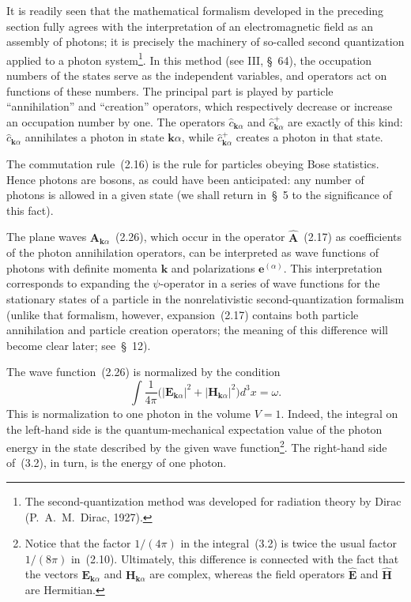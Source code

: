 It is readily seen that the mathematical formalism developed in the preceding section fully agrees with the interpretation of an electromagnetic field as an assembly of photons; it is precisely the machinery of so-called second quantization applied to a photon system\footnote{The second-quantization method was developed for radiation theory by Dirac (P.~A.~M.~Dirac, 1927).}. In this method (see III, \S~64), the occupation numbers of the states serve as the independent variables, and operators act on functions of these numbers. The principal part is played by particle ``annihilation'' and ``creation'' operators, which respectively decrease or increase an occupation number by one. The operators $\widehat c_{\mathbf{k}\alpha}$ and $\widehat c^+_{\mathbf{k}\alpha}$ are exactly of this kind: $\widehat c_{\mathbf{k}\alpha}$ annihilates a photon in state $\mathbf{k}\alpha$, while $\widehat c^+_{\mathbf{k}\alpha}$ creates a photon in that state.

The commutation rule~(2.16) is the rule for particles obeying Bose statistics. Hence photons are bosons, as could have been anticipated: any number of photons is allowed in a given state (we shall return in~\S~5 to the significance of this fact).

The plane waves $\mathbf{A}_{\mathbf{k}\alpha}$~(2.26), which occur in the operator $\widehat{\mathbf A}$~(2.17) as coefficients of the photon annihilation operators, can be interpreted as wave functions of photons with definite momenta $\mathbf{k}$ and polarizations $\mathbf{e}^{(\alpha)}$. This interpretation corresponds to expanding the $\psi$-operator in a series of wave functions for the stationary states of a particle in the nonrelativistic second-quantization formalism (unlike that formalism, however, expansion~(2.17) contains both particle annihilation and particle creation operators; the meaning of this difference will become clear later; see~\S~12).

The wave function~(2.26) is normalized by the condition
\begin{equation}
\int \frac{1}{4\pi}\bigl(|\mathbf{E}_{\mathbf{k}\alpha}|^2+|\mathbf{H}_{\mathbf{k}\alpha}|^2\bigr)d^3x=\omega.
\tag{3.2}
\end{equation}
This is normalization to one photon in the volume $V=1$. Indeed, the integral on the left-hand side is the quantum-mechanical expectation value of the photon energy in the state described by the given wave function\footnote{Notice that the factor $1/(4\pi)$ in the integral~(3.2) is twice the usual factor $1/(8\pi)$ in~(2.10). Ultimately, this difference is connected with the fact that the vectors $\mathbf{E}_{\mathbf{k}\alpha}$ and $\mathbf{H}_{\mathbf{k}\alpha}$ are complex, whereas the field operators $\widehat{\mathbf E}$ and $\widehat{\mathbf H}$ are Hermitian.}. The right-hand side of~(3.2), in turn, is the energy of one photon.

